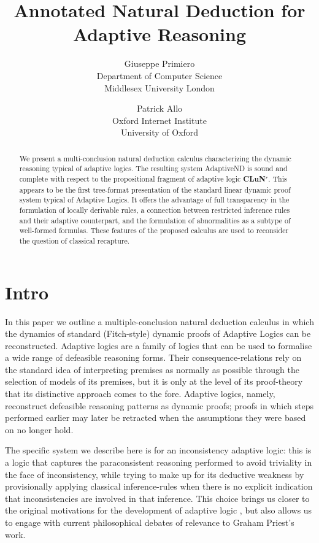 \documentclass[]{article}
\title{Annotated Natural Deduction for Adaptive Reasoning}
\author{Giuseppe Primiero\\
Department of Computer Science\\
Middlesex University London\\
 \and Patrick Allo\\
 Oxford Internet Institute\\
 University of Oxford}
\date{}
\begin{document}
\maketitle

\begin{abstract}
We present a multi-conclusion natural deduction calculus characterizing the dynamic reasoning typical of adaptive logics. The resulting system {\sf AdaptiveND} is sound and complete with respect to the propositional fragment of adaptive logic \textbf{CLuN$^r$}. This appears to be the first tree-format presentation of the standard linear dynamic proof system typical of Adaptive Logics. It offers the advantage of full transparency in the formulation of locally derivable rules, a connection between restricted inference rules and their adaptive counterpart, and the formulation of abnormalities as a subtype of well-formed formulas. These features of the proposed calculus are used to reconsider the question of classical recapture.
\end{abstract}

\section{Intro}

In this paper we outline a multiple-conclusion natural deduction calculus in which the dynamics of standard (Fitch-style) dynamic proofs of Adaptive Logics \cite{batens07} can be reconstructed. Adaptive logics are a family of logics that can be used to formalise a wide range of defeasible reasoning forms. Their consequence-relations rely on the standard idea of interpreting premises as normally as possible through the selection of models of its premises, but it is only at the level of its proof-theory that its distinctive approach comes to the fore. Adaptive logics, namely, reconstruct defeasible reasoning patterns as dynamic proofs; proofs in which steps performed earlier may later be retracted when the assumptions they were based on no longer hold.

The specific system we describe here is for an inconsistency adaptive logic: this is a logic that captures the paraconsistent reasoning performed to avoid triviality in the face of inconsistency, while trying to make up for its deductive weakness by provisionally applying classical inference-rules when there is no explicit indication that inconsistencies are involved in that inference. This choice brings us closer to the original motivations for the development of adaptive logic \cite{Batens:ParaconsistentLogicEssaysOnTheInconsistent:1989}, but also allows us to engage with current philosophical debates of relevance to Graham Priest's work.
\end{document}
